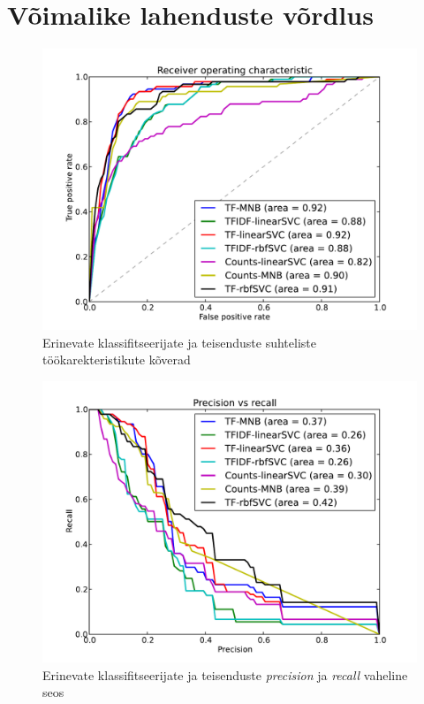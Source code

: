 \documentclass[]{trkuur}
\let\eng\emph
\begin{document}
\section{Võimalike lahenduste võrdlus}
\begin{figure}
\includegraphics[width=0.93\linewidth]{finalroc}
\caption{Erinevate klassifitseerijate ja teisenduste suhteliste töökarekteristikute kõverad}
\label{finalroc}
\end{figure}

\begin{figure}
\includegraphics[width=0.93\linewidth]{finalprrec}
\caption{Erinevate klassifitseerijate ja teisenduste \eng{precision} ja \eng{recall} vaheline seos}
\label{finalprrec}
\end{figure}
\end{document}
